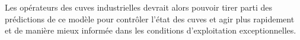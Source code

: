 Les opérateurs des cuves industrielles devrait alors pouvoir tirer
parti des prédictions de ce modèle pour contrôler l'état des cuves
et agir plus rapidement et de manière mieux informée dans les
conditions d'exploitation exceptionnelles.

